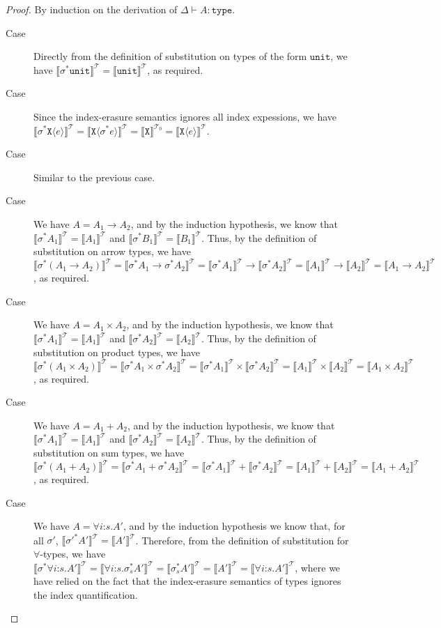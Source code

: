 \documentclass[natbib,preprint]{sigplanconf}
\newcommand{\sortType}{\texttt{type}}
\newcommand{\tyUnit}{\texttt{unit}}
\newcommand{\tyPrim}[2]{\texttt{#1}\langle #2 \rangle}
\newcommand{\tyPrimNm}[1]{\texttt{#1}}
\newcommand{\tyArr}{\to}
\newcommand{\tyProduct}{\times}
\newcommand{\tySem}[1]{\llbracket #1 \rrbracket^{\mathcal{T}}}
\newcommand{\tyPrimSem}[1]{\llbracket \tyPrimNm{#1} \rrbracket^{\mathcal{T}_0}}
\begin{document}
\begin{proof}
  By induction on the derivation of $\Delta \vdash A : \sortType$.
  \begin{description}
  \item[Case ] Directly from the definition of
    substitution on types of the form $\tyUnit$, we have
    $\tySem{\sigma^*\tyUnit} = \tySem{\tyUnit}$, as required.
  \item[Case ] Since the index-erasure semantics
    ignores all index expessions, we have
    $\tySem{\sigma^*\tyPrim{X}{e}} = \tySem{\tyPrim{X}{\sigma^*e}} =
    \tyPrimSem{X} = \tySem{\tyPrim{X}{e}}$.
  \item[Case ] Similar to the previous case.
  \item[Case ] We have $A = A_1 \tyArr A_2$, and by the
    induction hypothesis, we know that $\tySem{\sigma^*A_1} =
    \tySem{A_1}$ and $\tySem{\sigma^*B_1} = \tySem{B_1}$. Thus, by the
    definition of substitution on arrow types, we have
    $\tySem{\sigma^*(A_1 \tyArr A_2)} = \tySem{\sigma^*A_1 \tyArr
      \sigma^*A_2} = \tySem{\sigma^*A_1} \to \tySem{\sigma^*A_2} =
    \tySem{A_1} \to \tySem{A_2} = \tySem{A_1 \tyArr A_2}$, as
    required.
  \item[Case ] We have $A = A_1 \tyProduct A_2$, and
    by the induction hypothesis, we know that $\tySem{\sigma^*A_1} =
    \tySem{A_1}$ and $\tySem{\sigma^*A_2} = \tySem{A_2}$. Thus, by the
    definition of substitution on product types, we have
    $\tySem{\sigma^*(A_1 \tyProduct A_2)} = \tySem{\sigma^*A_1
      \tyProduct \sigma^*A_2} = \tySem{\sigma^*A_1} \times
    \tySem{\sigma^*A_2} = \tySem{A_1} \times \tySem{A_2} = \tySem{A_1
      \tyProduct A_2}$, as required.
  \item[Case ] We have $A = A_1 + A_2$, and by the
    induction hypothesis, we know that $\tySem{\sigma^*A_1} =
    \tySem{A_1}$ and $\tySem{\sigma^*A_2} = \tySem{A_2}$. Thus, by the
    definition of substitution on sum types, we have
    $\tySem{\sigma^*(A_1 + A_2)} = \tySem{\sigma^*A_1 + \sigma^*A_2} =
    \tySem{\sigma^*A_1} + \tySem{\sigma^*A_2} = \tySem{A_1} +
    \tySem{A_2} = \tySem{A_1 + A_2}$, as required.
  \item[Case ] We have $A = \forall i\mathord:s.A'$,
    and by the induction hypothesis we know that, for all $\sigma'$,
    $\tySem{\sigma'^*A'} = \tySem{A'}$. Therefore, from the definition
    of substitution for $\forall$-types, we have
    $\tySem{\sigma^*\forall i\mathord:s.A'} = \tySem{\forall
      i\mathord:s.\sigma_s^{*}A'} = \tySem{\sigma_s^{*}A'} = \tySem{A'}
    = \tySem{\forall i\mathord:s.A'}$, where we have relied on the
    fact that the index-erasure semantics of types ignores the index
    quantification.
  \end{description}
\end{proof}
\end{document}
